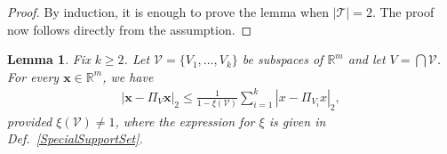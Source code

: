 \documentclass[journal, twocolumn]{IEEEtran}
\newtheorem{lemma}{Lemma}
\begin{document}
\begin{proof}By induction, it is enough to prove the lemma when $|\mathcal{T}| = 2$. The proof now follows directly from the assumption.
\end{proof}


\begin{lemma}\label{DistanceToIntersectionLemma}
Fix $k \geq 2$. Let $\mathcal{V} = \{V_1, \ldots, V_k\}$ be subspaces of $\mathbb{R}^m$ and let $V = \bigcap \mathcal{V}$. For every $\mathbf{x} \in \mathbb{R}^m$, we have
\begin{align}\label{DTILeq}
|\mathbf{x} - \Pi_V \mathbf{x}|_2 \leq \frac{1}{1 - \xi(\mathcal{V})} \sum_{i=1}^k |x - \Pi_{V_i} x|_2,
\end{align}
provided $\xi(\mathcal{V}) \neq 1$, where the expression for $\xi$ is given in Def.~\ref{SpecialSupportSet}.
\end{lemma}
\end{document}
